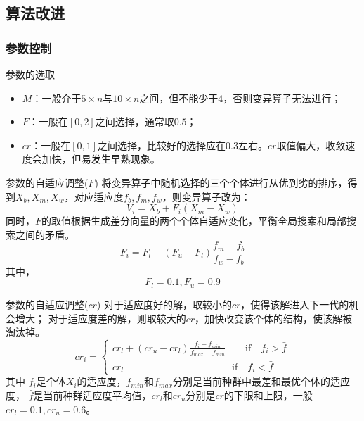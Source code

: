 \subsection{算法改进}
\subsubsection{参数控制}

\begin{frame}{参数的选取}
	\begin{itemize}
		\item $M$：一般介于$5\times n$与$10\times n$之间，但不能少于$4$，否则变异算子无法进行；
		\item $F$：一般在$[0,2]$之间选择，通常取$0.5$；
		\item $cr$：一般在$[0,1]$之间选择，比较好的选择应在$0.3$左右。$cr$取值偏大，收敛速度会加快，但易发生早熟现象。
	\end{itemize}
\end{frame}

\begin{frame}{参数的自适应调整($F$)}
	将变异算子中随机选择的三个个体进行从优到劣的排序，得到$X_b,X_m,X_w$，对应适应度$f_b,f_m,f_w$，则变异算子改为：
	$$V_i=X_b+F_i\left(X_m-X_w\right)$$
	同时，$F$的取值根据生成差分向量的两个个体自适应变化，平衡全局搜索和局部搜索之间的矛盾。
	$$F_i = F_l +\left(F_u-F_l\right)\frac{f_m-f_b}{f_w-f_b}$$
	其中，$$F_l=0.1,F_u=0.9$$
\end{frame}

\begin{frame}{参数的自适应调整($cr$)}
	对于适应度好的解，取较小的$cr$，使得该解进入下一代的机会增大；
	对于适应度差的解，则取较大的$cr$，加快改变该个体的结构，使该解被淘汰掉。
	$$
	cr_i =
	\begin{cases}
		cr_l+\left(cr_u-cr_l\right)\frac{f_i-f_{min}}{f_{max}-f_{min}}  \qquad \mathrm{if} \quad f_i>\bar{f} \\
		cr_l \qquad\qquad \qquad \qquad \qquad \quad \mathrm{if}\quad f_i<\bar{f}
	\end{cases}
	$$
	其中 $f_i$是个体$X_i$的适应度，$f_{min}$和$f_{max}$分别是当前种群中最差和最优个体的适应度，
	$\bar{f}$是当前种群适应度平均值，$cr_l$和$cr_u$分别是$cr$的下限和上限，一般$cr_l=0.1,cr_u=0.6$。
\end{frame}

